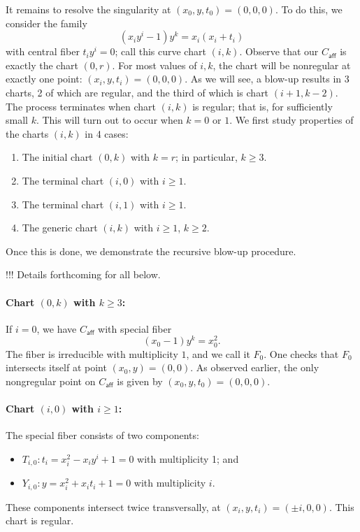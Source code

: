 \documentclass[pagesize,paper=letter]{scrartcl}
\newcommand{\caff}{C_{\textsf{aff}}}
\theoremstyle{plain}
\theoremstyle{definition}
\theoremstyle{remark}
\begin{document}
It remains to resolve the singularity at $(x_0, y, t_0) = (0, 0, 0)$. To do this, we consider the family
\[
(x_iy^i - 1) y^k = x_i(x_i + t_i)
\]
with central fiber $t_iy^i = 0$; call this curve chart $(i,k)$. Observe that our $\caff$ is exactly the chart $(0,r)$. For most values of $i, k$, the chart will be nonregular at exactly one point: $(x_i, y, t_i) = (0, 0, 0)$. As we will see, a blow-up results in 3 charts, 2 of which are regular, and the third of which is chart $(i+1, k-2)$. The process terminates when chart $(i, k)$ is regular; that is, for sufficiently small $k$. This will turn out to occur when $k = 0$ or $1$. We first study properties of the charts $(i, k)$ in 4 cases:
\begin{enumerate}
    \item The initial chart $(0, k)$ with $k = r$; in particular, $k \geq 3$.
    \item The terminal chart $(i, 0)$ with $i \geq 1$.
    \item The terminal chart $(i, 1)$ with $i \geq 1$.
    \item The generic chart $(i, k)$ with $i \geq 1$, $k \geq 2$.
\end{enumerate}
Once this is done, we demonstrate the recursive blow-up procedure.

!!! Details forthcoming for all below.

\paragraph{Chart $(0, k)$ with $k \geq 3$:}
\label{sec:case-i=0}

If $i = 0$, we have $\caff$ with special fiber
\[
(x_0 - 1) y^k = x_0^2.
\]
The fiber is irreducible with multiplicity $1$, and we call it $F_0$. One checks that $F_0$ intersects itself at point $(x_0, y) = (0, 0)$. As observed earlier, the only nongregular point on $\caff$ is given by $(x_0, y, t_0) = (0, 0, 0)$.

\paragraph{Chart $(i, 0)$ with $i \geq 1$:}
\label{sec:case-k=0}

The special fiber consists of two components:
\begin{itemize}
    \item $T_{i,0}: t_i = x_i^2 - x_iy^i + 1 = 0$ with multiplicity 1; and
    \item $Y_{i,0}: y = x_i^2 + x_it_i + 1 = 0$ with multiplicity $i$.
\end{itemize}
These components intersect twice transversally, at $(x_i, y, t_i) = (\pm i, 0, 0)$. This chart is regular.
\end{document}
